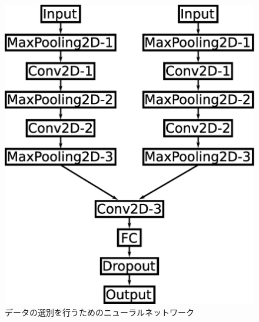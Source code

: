 \documentclass{jps-cp}
\begin{document}
\vspace{-2zw}
\begin{figure}
  \centering
  \begin{minipage}{0.4\columnwidth}
    \centering
    \includegraphics[clip, width=0.9\columnwidth]{eps/event_selection.eps}
    \caption{データの選別を行うためのニューラルネットワーク}
    \label{fig:selection}
  \end{minipage}
  \hfill
  \begin{minipage}{0.4\columnwidth}
    \centering

\end{minipage}
\end{figure}
\end{document}
